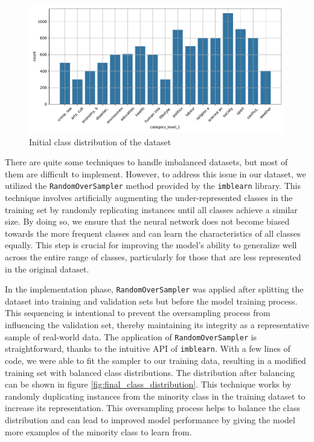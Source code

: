 \begin{figure}[htpb]
	\centering
	\includegraphics[width=\linewidth]{Images/initial_class_distribution.pdf}
	\caption{Initial class distribution of the dataset}
	\label{fig:initial_class_distribution}
\end{figure}

There are quite some techniques to handle imbalanced datasets, but most of them are difficult to implement. However,
to address this issue in our dataset, we utilized the \verb|RandomOverSampler| method provided by the \verb|imblearn| library.
This technique involves artificially augmenting the under-represented classes in the training set by randomly replicating instances until all classes achieve a similar size. By doing so, we ensure that the neural network does not become biased towards the more frequent classes and can learn the characteristics of all classes equally. This step is crucial for improving the model's ability to generalize well across the entire range of classes, particularly for those that are less represented in the original dataset.

In the implementation phase, \verb|RandomOverSampler| was applied after splitting the dataset into training and validation sets but before the model training process. This sequencing is intentional to prevent the oversampling process from influencing the validation set, thereby maintaining its integrity as a representative sample of real-world data. The application of \verb|RandomOverSampler| is straightforward, thanks to the intuitive API of \verb|imblearn|. With a few lines of code, we were able to fit the sampler to our training data, resulting in a modified training set with balanced class distributions. The distribution after balancing can be shown in figure \ref{fig:final_class_distribution}.
This technique works by randomly duplicating instances from the minority class in the training dataset to increase its representation. This oversampling process helps to balance the class distribution and can lead to improved model performance by giving the model more examples of the minority class to learn from.

